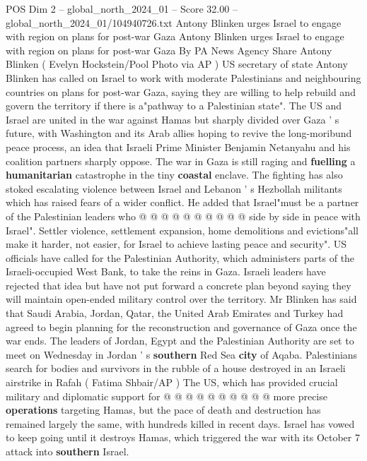 \begin{textsample}{POS Dim 2 – global\_north\_2024\_01 – Score 32.00 – global\_north\_2024\_01/104940726.txt}  \label{ex:f2_pos_204}
Antony Blinken urges Israel to engage with region on plans for post-war Gaza Antony Blinken urges Israel to engage with region on plans for post-war Gaza By PA News Agency Share Antony Blinken ( Evelyn Hockstein/Pool Photo via AP ) US secretary of state Antony Blinken has called on Israel to work with moderate Palestinians and neighbouring countries on plans for post-war Gaza, saying they are willing to help rebuild and govern the territory if there is a"pathway to a Palestinian state".
The US and Israel are united in the war against Hamas but sharply divided over Gaza ' s future, with Washington and its Arab allies hoping to revive the long-moribund peace process, an idea that Israeli Prime Minister Benjamin Netanyahu and his coalition partners sharply oppose.
The war in Gaza is still raging and \textbf{fuelling} a \textbf{humanitarian} catastrophe in the tiny \textbf{coastal} enclave.
The fighting has also stoked escalating violence between Israel and Lebanon ' s Hezbollah militants which has raised fears of a wider conflict.
He added that Israel"must be a partner of the Palestinian leaders who @ @ @ @ @ @ @ @ @ @ side by side in peace with Israel".
Settler violence, settlement expansion, home demolitions and evictions"all make it harder, not easier, for Israel to achieve lasting peace and security".
US officials have called for the Palestinian Authority, which administers parts of the Israeli-occupied West Bank, to take the reins in Gaza.
Israeli leaders have rejected that idea but have not put forward a concrete plan beyond saying they will maintain open-ended military control over the territory.
Mr Blinken has said that Saudi Arabia, Jordan, Qatar, the United Arab Emirates and Turkey had agreed to begin planning for the reconstruction and governance of Gaza once the war ends.
The leaders of Jordan, Egypt and the Palestinian Authority are set to meet on Wednesday in Jordan ' s \textbf{southern} Red Sea \textbf{city} of Aqaba.
Palestinians search for bodies and survivors in the rubble of a house destroyed in an Israeli airstrike in Rafah ( Fatima Shbair/AP ) The US, which has provided crucial military and diplomatic support for @ @ @ @ @ @ @ @ @ @ more precise \textbf{operations} targeting Hamas, but the pace of death and destruction has remained largely the same, with hundreds killed in recent days.
Israel has vowed to keep going until it destroys Hamas, which triggered the war with its October 7 attack into \textbf{southern} Israel.

\end{textsample}
